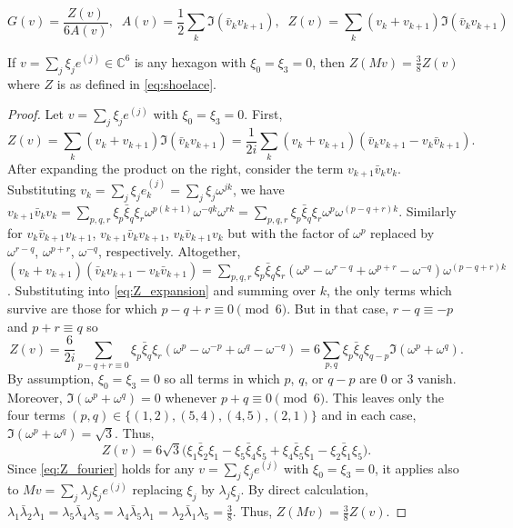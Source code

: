 \documentclass[10pt,a4paper]{amsart}
\newcommand*\C{\mathbb C}
\begin{document}
\begin{equation}
    G(v) = \frac{Z(v)}{6A(v)},
    \;\;
    A(v) = \frac12\sum_k \Im(\bar v_kv_{k+1}),
    \;\;
    Z(v) = \sum_k (v_k+v_{k+1})\Im(\bar v_kv_{k+1})
    \label{eq:shoelace}
\end{equation}

\begin{lemma}
    If $v = \sum_j \xi_je^{(j)}\in \C^6$ is any hexagon with $\xi_0=\xi_3=0$, then $Z(Mv) = \frac38 Z(v)$ where $Z$ is as defined in \eqref{eq:shoelace}.
    \label{lemma:real_centroid_scaling}
\end{lemma}

\begin{proof}
    Let $v = \sum_j \xi_je^{(j)}$ with $\xi_0=\xi_3=0$. First, 
    \begin{equation}
        Z(v) = \sum_k (v_k+v_{k+1})\Im(\bar v_kv_{k+1}) = \frac1{2i}\sum_k(v_k+v_{k+1})(\bar v_kv_{k+1}-v_k\bar v_{k+1}).
        \label{eq:Z_expansion}
    \end{equation}
    After expanding the product on the right, consider the term $v_{k+1}\bar v_kv_k$. Substituting $v_k = \sum_j \xi_je^{(j)}_k = \sum_j \xi_j\omega^{jk}$, we have
    $
        v_{k+1}\bar v_kv_k
        = \sum_{p,q,r} \xi_p\bar\xi_q\xi_r\omega^{p(k+1)}\omega^{-qk}\omega^{rk}
        = \sum_{p,q,r} \xi_p\bar\xi_q\xi_r\omega^p\omega^{(p-q+r)k}.
    $
    Similarly for $v_k\bar v_{k+1}v_{k+1}$, $v_{k+1}\bar v_kv_{k+1}$, $v_k\bar v_{k+1}v_k$ but with the factor of $\omega^p$ replaced by $\omega^{r-q}$, $\omega^{p+r}$, $\omega^{-q}$, respectively. Altogether, $(v_k+v_{k+1})(\bar v_kv_{k+1}-v_k\bar v_{k+1}) = \sum_{p,q,r} \xi_p\bar\xi_q\xi_r(\omega^p-\omega^{r-q}+\omega^{p+r}-\omega^{-q})\omega^{(p-q+r)k}$.
    Substituting into \eqref{eq:Z_expansion} and summing over $k$, the only terms which survive are those for which $p-q+r \equiv 0 \pmod 6$. But in that case, $r-q\equiv -p$ and $p+r\equiv q$ so
    \[
        Z(v) 
        = \frac{6}{2i}\sum_{p-q+r\equiv 0} \xi_p\bar\xi_q\xi_r(\omega^p-\omega^{-p}+\omega^q-\omega^{-q})
        = 6\sum_{p,q} \xi_p\bar\xi_q\xi_{q-p}\Im(\omega^p+\omega^q).
    \]
    By assumption, $\xi_0=\xi_3 = 0$ so all terms in which $p$, $q$, or $q-p$ are $0$ or $3$ vanish. Moreover, $\Im(\omega^p+\omega^q)=0$ whenever $p+q\equiv0\pmod 6$. This leaves only the four terms $(p,q) \in \{(1,2),(5,4),(4,5),(2,1)\}$ and in each case, $\Im(\omega^p+\omega^q)=\sqrt{3}$. Thus,
    \begin{equation}
        Z(v)
        = 6\sqrt 3\big( \xi_1\bar\xi_2\xi_1-\xi_5\bar\xi_4\xi_5 + \xi_4\bar\xi_5\xi_1 - \xi_2\bar\xi_1\xi_5 \big).
        \label{eq:Z_fourier}
    \end{equation}
    Since \eqref{eq:Z_fourier} holds for any $v = \sum_j\xi_je^{(j)}$ with $\xi_0=\xi_3=0$, it applies also to $Mv = \sum_j\lambda_j\xi_je^{(j)}$ replacing $\xi_j$ by $\lambda_j\xi_j$. By direct calculation, $\lambda_1\bar\lambda_2\lambda_1 = \lambda_5\bar\lambda_4\lambda_5 = \lambda_4\bar\lambda_5\lambda_1 = \lambda_2\bar\lambda_1\lambda_5 = \frac38$. Thus, $Z(Mv) = \frac38Z(v)$. 
\end{proof}
\end{document}
